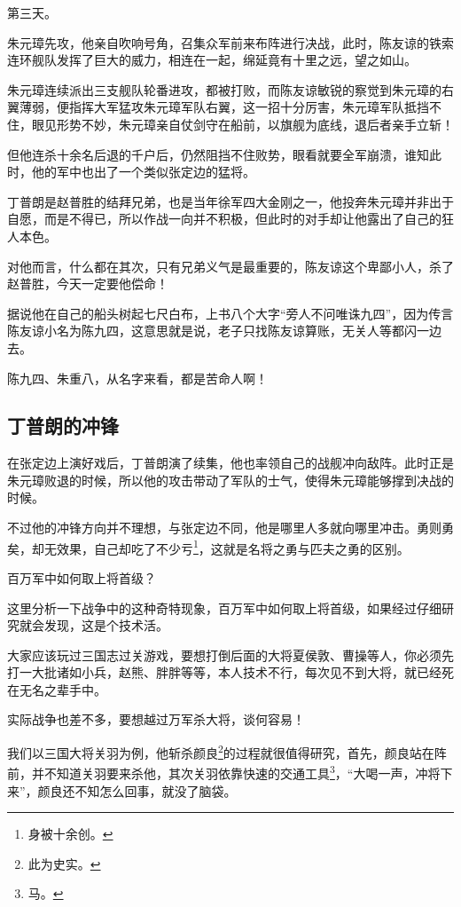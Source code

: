 \begin{multicols}{\theparacolNo}
		第三天。

		朱元璋先攻，他亲自吹响号角，召集众军前来布阵进行决战，此时，陈友谅的铁索连环舰队发挥了巨大的威力，相连在一起，绵延竟有十里之远，望之如山。

		朱元璋连续派出三支舰队轮番进攻，都被打败，而陈友谅敏锐的察觉到朱元璋的右翼薄弱，便指挥大军猛攻朱元璋军队右翼，这一招十分厉害，朱元璋军队抵挡不住，眼见形势不妙，朱元璋亲自仗剑守在船前，以旗舰为底线，退后者亲手立斩！

		但他连杀十余名后退的千户后，仍然阻挡不住败势，眼看就要全军崩溃，谁知此时，他的军中也出了一个类似张定边的猛将。

		丁普朗是赵普胜的结拜兄弟，也是当年徐军四大金刚之一，他投奔朱元璋并非出于自愿，而是不得已，所以作战一向并不积极，但此时的对手却让他露出了自己的狂人本色。

		对他而言，什么都在其次，只有兄弟义气是最重要的，陈友谅这个卑鄙小人，杀了赵普胜，今天一定要他偿命！

		据说他在自己的船头树起七尺白布，上书八个大字“旁人不问唯诛九四”，因为传言陈友谅小名为陈九四，这意思就是说，老子只找陈友谅算账，无关人等都闪一边去。

		陈九四、朱重八，从名字来看，都是苦命人啊！

		\subsection{丁普朗的冲锋}
		在张定边上演好戏后，丁普朗演了续集，他也率领自己的战舰冲向敌阵。此时正是朱元璋败退的时候，所以他的攻击带动了军队的士气，使得朱元璋能够撑到决战的时候。

		不过他的冲锋方向并不理想，与张定边不同，他是哪里人多就向哪里冲击。勇则勇矣，却无效果，自己却吃了不少亏\footnote{身被十余创。}，这就是名将之勇与匹夫之勇的区别。

		百万军中如何取上将首级？

		这里分析一下战争中的这种奇特现象，百万军中如何取上将首级，如果经过仔细研究就会发现，这是个技术活。

		大家应该玩过三国志过关游戏，要想打倒后面的大将夏侯敦、曹操等人，你必须先打一大批诸如小兵，赵熊、胖胖等等，本人技术不行，每次见不到大将，就已经死在无名之辈手中。

		实际战争也差不多，要想越过万军杀大将，谈何容易！

		我们以三国大将关羽为例，他斩杀颜良\footnote{此为史实。}的过程就很值得研究，首先，颜良站在阵前，并不知道关羽要来杀他，其次关羽依靠快速的交通工具\footnote{马。}，“大喝一声，冲将下来”，颜良还不知怎么回事，就没了脑袋。


\end{multicols}
